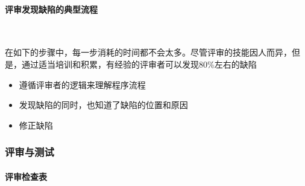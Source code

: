 \paragraph{评审发现缺陷的典型流程}~{} \par
在如下的步骤中，每一步消耗的时间都不会太多。尽管评审的技能因人而异，但是，通过适当培训和积累，有经验的评审者可以发现80\%左右的缺陷
\vspace{-0.8em}
\begin{multicols}{2}
    \begin{itemize}
        \item 遵循评审者的逻辑来理解程序流程
        \item 发现缺陷的同时，也知道了缺陷的位置和原因
        \item 修正缺陷
    \end{itemize}
\end{multicols}
\vspace{-1em}

\subsubsection{评审与测试}

\paragraph{评审检查表}~{} \par

